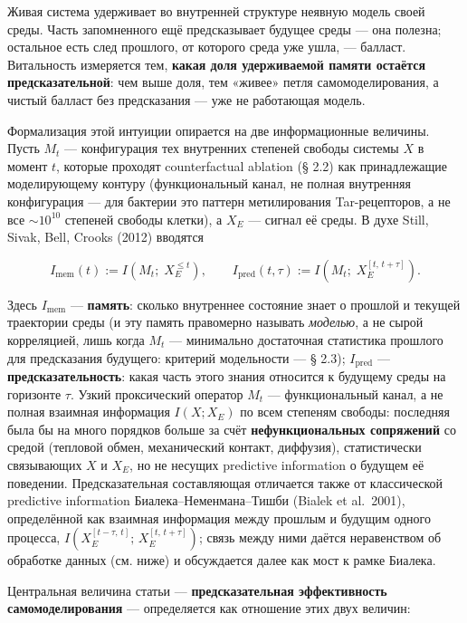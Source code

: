 \documentclass[pdflatex,sn-mathphys-ay]{sn-jnl}
\begin{document}
Живая система удерживает во внутренней структуре неявную модель своей среды. Часть запомненного ещё предсказывает будущее среды --- она полезна; остальное есть след прошлого, от которого среда уже ушла, --- балласт. Витальность измеряется тем, \textbf{какая доля удерживаемой памяти остаётся предсказательной}: чем выше доля, тем «живее» петля самомоделирования, а чистый балласт без предсказания --- уже не работающая модель.

Формализация этой интуиции опирается на две информационные величины. Пусть \(M_t\) --- конфигурация тех внутренних степеней свободы системы \(X\) в момент \(t\), которые проходят counterfactual ablation (§ 2.2) как принадлежащие моделирующему контуру (функциональный канал, не полная внутренняя конфигурация --- для бактерии это паттерн метилирования Tar-рецепторов, а не все \(\sim 10^{10}\) степеней свободы клетки), а \(X_E\) --- сигнал её среды. В духе Still, Sivak, Bell, Crooks (2012) вводятся

\begin{equation}I_{\text{mem}}(t) := I\!\left(M_t;\; X_E^{\le t}\right), \qquad
  I_{\text{pred}}(t,\tau) := I\!\left(M_t;\; X_E^{[t,\,t+\tau]}\right). \tag{1a}\end{equation}

Здесь \(I_{\text{mem}}\) --- \textbf{память}: сколько внутреннее состояние знает о прошлой и текущей траектории среды (и эту память правомерно называть \emph{моделью}, а не сырой корреляцией, лишь когда \(M_t\) --- минимально достаточная статистика прошлого для предсказания будущего: критерий модельности --- § 2.3); \(I_{\text{pred}}\) --- \textbf{предсказательность}: какая часть этого знания относится к будущему среды на горизонте \(\tau\). Узкий проксический оператор \(M_t\) --- функциональный канал, а не полная взаимная информация \(I(X; X_E)\) по всем степеням свободы: последняя была бы на много порядков больше за счёт \textbf{нефункциональных сопряжений} со средой (тепловой обмен, механический контакт, диффузия), статистически связывающих \(X\) и \(X_E\), но не несущих predictive information о будущем её поведении. Предсказательная составляющая отличается также от классической predictive information Биалека--Неменмана--Тишби (Bialek et al.~2001), определённой как взаимная информация между прошлым и будущим одного процесса, \(I(X_E^{[t-\tau,\,t]};\, X_E^{[t,\,t+\tau]})\); связь между ними даётся неравенством об обработке данных (см. ниже) и обсуждается далее как мост к рамке Биалека.

Центральная величина статьи --- \textbf{предсказательная эффективность самомоделирования} --- определяется как отношение этих двух величин:
\end{document}
